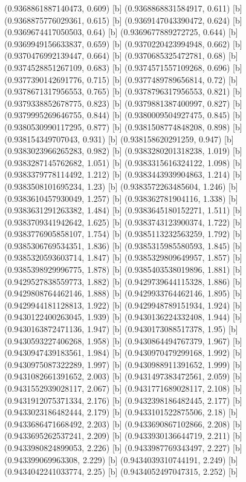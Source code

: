 {{{(0.9368861887140473, 0.609) [b] 
(0.9368868831584917, 0.611) [b] 
(0.9368875776029361, 0.615) [b] 
(0.9369147043390472, 0.624) [b] 
(0.9369674417050503, 0.64) [b] 
(0.9369677889272725, 0.644) [b] 
(0.9369949156633837, 0.659) [b] 
(0.9370220423994948, 0.662) [b] 
(0.9370476992139447, 0.664) [b] 
(0.9370685325472781, 0.68) [b] 
(0.9374528851267109, 0.683) [b] 
(0.9374571557109268, 0.696) [b] 
(0.9377390142691776, 0.715) [b] 
(0.9377489789656814, 0.72) [b] 
(0.9378671317956553, 0.765) [b] 
(0.9378796317956553, 0.821) [b] 
(0.9379338852678775, 0.823) [b] 
(0.9379881387400997, 0.827) [b] 
(0.9379995269646755, 0.844) [b] 
(0.9380009504927475, 0.845) [b] 
(0.9380530990117295, 0.877) [b] 
(0.9381508774848208, 0.898) [b] 
(0.938154349707043, 0.931) [b] 
(0.938158620291259, 0.947) [b] 
(0.9383023966265283, 0.982) [b] 
(0.9383280201318238, 1.019) [b] 
(0.9383287145762682, 1.051) [b] 
(0.9383315616324122, 1.098) [b] 
(0.9383379778114492, 1.212) [b] 
(0.9383443939904863, 1.214) [b] 
(0.9383508101695234, 1.23) [b] 
(0.9383572263485604, 1.246) [b] 
(0.9383610457930049, 1.257) [b] 
(0.938362781904116, 1.338) [b] 
(0.9383631291263382, 1.484) [b] 
(0.9383645180152271, 1.511) [b] 
(0.9383709341942642, 1.625) [b] 
(0.9383743123900374, 1.722) [b] 
(0.9383776905858107, 1.754) [b] 
(0.9385113232563259, 1.792) [b] 
(0.9385306769534351, 1.836) [b] 
(0.9385315985580593, 1.845) [b] 
(0.9385320593603714, 1.847) [b] 
(0.9385329809649957, 1.857) [b] 
(0.9385398929996775, 1.878) [b] 
(0.9385403538019896, 1.881) [b] 
(0.9429527838559773, 1.882) [b] 
(0.9429739644115328, 1.886) [b] 
(0.9429808764462146, 1.888) [b] 
(0.9429933764462146, 1.895) [b] 
(0.9429944181128813, 1.922) [b] 
(0.9429948789151934, 1.924) [b] 
(0.9430122400263045, 1.939) [b] 
(0.9430136224332408, 1.944) [b] 
(0.9430163872471136, 1.947) [b] 
(0.9430173088517378, 1.95) [b] 
(0.9430593227406268, 1.958) [b] 
(0.9430864494767379, 1.967) [b] 
(0.9430947439183561, 1.984) [b] 
(0.9430970479299168, 1.992) [b] 
(0.9430975087322289, 1.997) [b] 
(0.9430988911391652, 1.999) [b] 
(0.9431082661391652, 2.003) [b] 
(0.9431497383472561, 2.059) [b] 
(0.9431552939028117, 2.067) [b] 
(0.9431771689028117, 2.108) [b] 
(0.9431912075371334, 2.176) [b] 
(0.9432398186482445, 2.177) [b] 
(0.9433023186482444, 2.179) [b] 
(0.9433101522875506, 2.18) [b] 
(0.9433686471668492, 2.203) [b] 
(0.9433690867102866, 2.208) [b] 
(0.9433695262537241, 2.209) [b] 
(0.9433930136644719, 2.211) [b] 
(0.9433980824899053, 2.226) [b] 
(0.9433987769343497, 2.227) [b] 
(0.943399069963308, 2.229) [b] 
(0.9434039310744191, 2.249) [b] 
(0.9434042241033774, 2.25) [b] 
(0.9434052497047315, 2.252) [b] 
}}}
